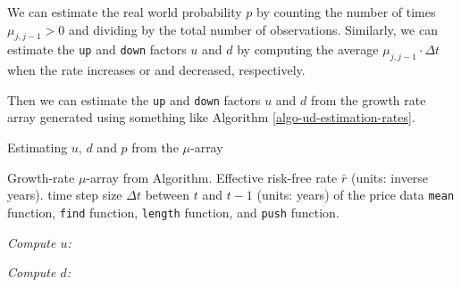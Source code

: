\documentclass[11pt]{article}
\theoremstyle{definition}
\begin{document}
\begin{concept}\label{concept:real-world-interest-rate-probabilities}
We can estimate the real world probability $p$ by counting the number of times $\mu_{j,j-1}>0$ and 
dividing by the total number of observations. Similarly, we can estimate the \texttt{up} and \texttt{down} factors $u$ and $d$ 
by computing the average $\mu_{j,j-1}\cdot{\Delta{t}}$ when the rate increases or and decreased, respectively.
\end{concept}
Then we can estimate the \texttt{up} and \texttt{down} factors $u$ and $d$ from the growth rate array 
generated using something like Algorithm \ref{algo-ud-estimation-rates}. 
\begin{algorithm}[h]
	\caption{Estimating $u$, $d$ and $p$ from the $\mu$-array}\label{algo-ud-estimation-rates}
	\begin{algorithmic}[1]

		\Require Growth-rate $\mu$-array from Algorithm.
		\Require Effective risk-free rate $\bar{r}$ (units: inverse years).
		\Require time step size $\Delta{t}$ between $t$ and $t-1$ (units: years) of the price data
		\Require \texttt{mean} function, \texttt{find} function, \texttt{length} function, and \texttt{push} function.

		\Statex
		\State
		
		\Statex
		\State \textit{Compute $u$:}
    	\EndFor
    	
		\Statex
		\State \textit{Compute $d$:}
    	\EndFor



		\Statex
		\Statex

		\State
		\Statex
		\EndProcedure
	\end{algorithmic}
\end{algorithm}


\clearpage


\clearpage
\printindex
\end{document}
